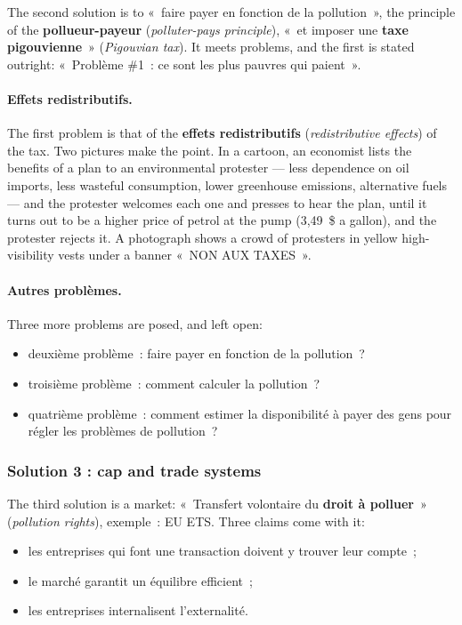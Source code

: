 The second solution is to «~faire payer en fonction de la pollution~», the
principle of the \textbf{pollueur-payeur} (\textit{polluter-pays principle}),
«~et imposer une \textbf{taxe pigouvienne}~» (\textit{Pigouvian tax}). It meets
problems, and the first is stated outright: «~Problème \#1~: ce sont les plus
pauvres qui paient~».

\paragraph{Effets redistributifs.} The first problem is that of the
\textbf{effets redistributifs} (\textit{redistributive effects}) of the tax. Two
pictures make the point. In a cartoon, an economist lists the benefits of a
plan to an environmental protester --- less dependence on oil imports, less
wasteful consumption, lower greenhouse emissions, alternative fuels --- and the
protester welcomes each one and presses to hear the plan, until it turns out to be
a higher price of petrol at the pump (3,49~\$ a gallon), and the protester rejects it. A
photograph shows a crowd of protesters in yellow high-visibility vests under a
banner «~NON AUX TAXES~».

\paragraph{Autres problèmes.} Three more problems are posed, and left open:
\begin{itemize}
  \item deuxième problème~: faire payer en fonction de la pollution~?
  \item troisième problème~: comment calculer la pollution~?
  \item quatrième problème~: comment estimer la disponibilité à payer des gens
    pour régler les problèmes de pollution~?
\end{itemize}

\subsubsection{Solution 3 : cap and trade systems}

The third solution is a market: «~Transfert volontaire du \textbf{droit à
polluer}~» (\textit{pollution rights}), exemple~: EU ETS. Three claims come with
it:
\begin{itemize}
  \item les entreprises qui font une transaction doivent y trouver leur compte~;
  \item le marché garantit un équilibre efficient~;
  \item les entreprises internalisent l'externalité.
\end{itemize}

